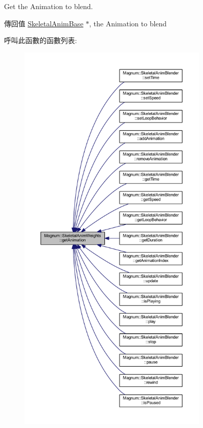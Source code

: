 Get the Animation to blend. 

\begin{DoxyReturn}{傳回值}
\hyperlink{class_magnum_1_1_skeletal_anim_base}{Skeletal\+Anim\+Base} $\ast$, the Animation to blend 
\end{DoxyReturn}


呼叫此函數的函數列表\+:\nopagebreak
\begin{figure}[H]
\begin{center}
\leavevmode
\includegraphics[height=550pt]{class_magnum_1_1_skeletal_anim_weights_a0ae3c60c195a0a28d32bec4e0c4b1b4d_icgraph}
\end{center}
\end{figure}


